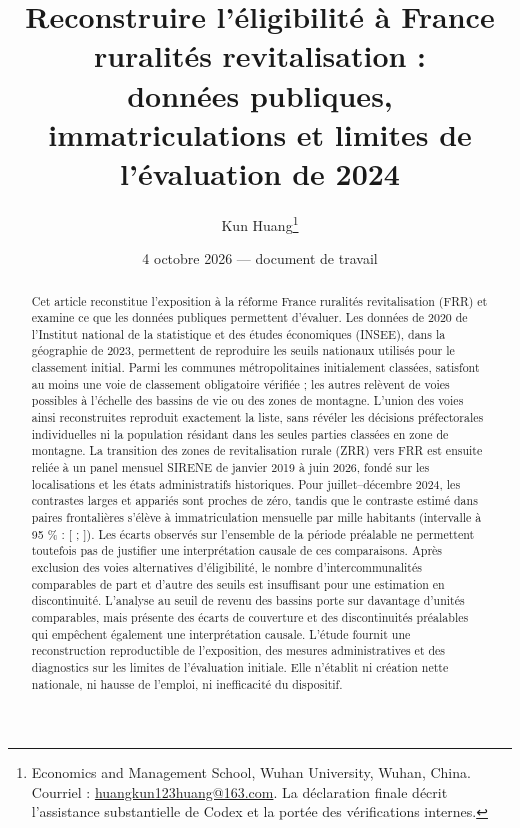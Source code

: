 
\title{Reconstruire l’éligibilité à France ruralités revitalisation :\\données publiques, immatriculations et limites de l’évaluation de 2024}
\author{Kun Huang\thanks{Economics and Management School, Wuhan University, Wuhan, China. Courriel : \href{mailto:huangkun123huang@163.com}{huangkun123huang@163.com}. La déclaration finale décrit l’assistance substantielle de Codex et la portée des vérifications internes.}}
\date{4 octobre 2026 — document de travail}

\maketitle
\begin{abstract}
Cet article reconstitue l’exposition à la réforme France ruralités revitalisation (FRR) et examine ce que les données publiques permettent d’évaluer. Les données de 2020 de l’Institut national de la statistique et des études économiques (INSEE), dans la géographie de 2023, permettent de reproduire les seuils nationaux utilisés pour le classement initial. Parmi les \AssignmentListedN{} communes métropolitaines initialement classées, \AssignmentMandatoryN{} satisfont au moins une voie de classement obligatoire vérifiée ; les \AssignmentResidualN{} autres relèvent de voies possibles à l’échelle des bassins de vie ou des zones de montagne. L’union des voies ainsi reconstruites reproduit exactement la liste, sans révéler les décisions préfectorales individuelles ni la population résidant dans les seules parties classées en zone de montagne. La transition des zones de revitalisation rurale (ZRR) vers FRR est ensuite reliée à un panel mensuel SIRENE de janvier 2019 à juin 2026, fondé sur les localisations et les états administratifs historiques. Pour juillet–décembre 2024, les contrastes larges et appariés sont proches de zéro, tandis que le contraste estimé dans \BorderPairs{} paires frontalières s’élève à \BorderCoef{} immatriculation mensuelle par mille habitants (intervalle à 95 \% : [\BorderLo{} ; \BorderHi{}]). Les écarts observés sur l’ensemble de la période préalable ne permettent toutefois pas de justifier une interprétation causale de ces comparaisons. Après exclusion des voies alternatives d’éligibilité, le nombre d’intercommunalités comparables de part et d’autre des seuils est insuffisant pour une estimation en discontinuité. L’analyse au seuil de revenu des bassins porte sur davantage d’unités comparables, mais présente des écarts de couverture et des discontinuités préalables qui empêchent également une interprétation causale. L’étude fournit une reconstruction reproductible de l’exposition, des mesures administratives et des diagnostics sur les limites de l’évaluation initiale. Elle n’établit ni création nette nationale, ni hausse de l’emploi, ni inefficacité du dispositif.
\end{abstract}
